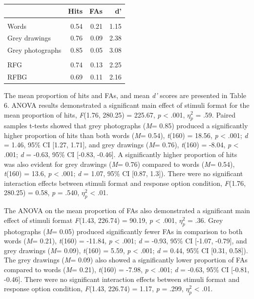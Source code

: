 \documentclass[
  11pt,
]{article}
\begin{document}
\begin{table}[!h]
\centering
\begin{tabular}{>{\raggedright\arraybackslash}p{4cm}rrr}
\toprule
  & Hits & FAs & d'\\
\midrule
\addlinespace[0.3em]
\multicolumn{4}{l}{\textbf{Stimuli format}}\\
\hspace{1em}Words & 0.54 & 0.21 & 1.15\\
\hspace{1em}Grey drawings & 0.76 & 0.09 & 2.38\\
\hspace{1em}Grey photographs & 0.85 & 0.05 & 3.08\\
\addlinespace[0.3em]
\multicolumn{4}{l}{\textbf{Response option}}\\
\hspace{1em}RFG & 0.74 & 0.13 & 2.25\\
\hspace{1em}RFBG & 0.69 & 0.11 & 2.16\\
\bottomrule
\end{tabular}
\end{table}

The mean proportion of hits and FAs, and mean \emph{d'} scores are
presented in Table 6. ANOVA results demonstrated a significant main
effect of stimuli format for the mean proportion of hits, \emph{F}(1.76,
280.25) = 225.67, \emph{p} \textless{} .001, \(\eta^2_p\) = .59. Paired
samples t-tests showed that grey photographs (\emph{M}= 0.85) produced a
significantly higher proportion of hits than both words (\emph{M}=
0.54), \emph{t}(160) = 18.56, \emph{p} \textless{} .001; \emph{d} =
1.46, 95\% CI {[}1.27, 1.71{]}, and grey drawings (\emph{M}= 0.76),
\emph{t}(160) = -8.04, \emph{p} \textless{} .001; \emph{d} = -0.63, 95\%
CI {[}-0.83, -0.46{]}. A significantly higher proportion of hits was
also evident for grey drawings (\emph{M}= 0.76) compared to words
(\emph{M}= 0.54), \emph{t}(160) = 13.6, \emph{p} \textless{} .001;
\emph{d} = 1.07, 95\% CI {[}0.87, 1.3{]}). There were no significant
interaction effects between stimuli format and response option
condition, \emph{F}(1.76, 280.25) = 0.58, \emph{p} = .540, \(\eta^2_p\)
\textless{} .01.

The ANOVA on the mean proportion of FAs also demonstrated a significant
main effect of stimuli format \emph{F}(1.43, 226.74) = 90.19, \emph{p}
\textless{} .001, \(\eta^2_p\) = .36. Grey photographs (\emph{M}= 0.05)
produced significantly fewer FAs in comparison to both words (\emph{M}=
0.21), \emph{t}(160) = -11.84, \emph{p} \textless{} .001; \emph{d} =
-0.93, 95\% CI {[}-1.07, -0.79{]}, and grey drawings (\emph{M}= 0.09),
\emph{t}(160) = 5.59, \emph{p} \textless{} .001; \emph{d} = 0.44, 95\%
CI {[}0.31, 0.58{]}). The grey drawings (\emph{M}= 0.09) also showed a
significantly lower proportion of FAs compared to words (\emph{M}=
0.21), \emph{t}(160) = -7.98, \emph{p} \textless{} .001; \emph{d} =
-0.63, 95\% CI {[}-0.81, -0.46{]}. There were no significant interaction
effects between stimuli format and response option condition,
\emph{F}(1.43, 226.74) = 1.17, \emph{p} = .299, \(\eta^2_p\) \textless{}
.01.
\end{document}
